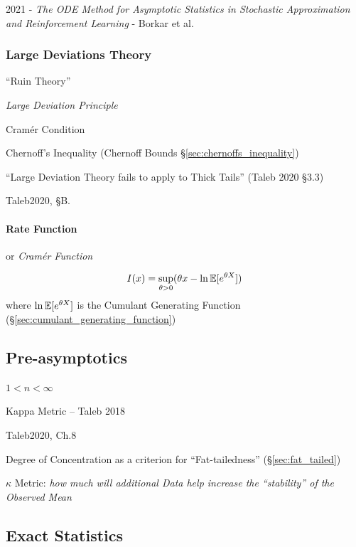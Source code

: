 2021 - \emph{The ODE Method for Asymptotic Statistics in Stochastic
Approximation and Reinforcement Learning} - Borkar et al.



\subsubsection{Large Deviations Theory}\label{sec:large_deviations_theory}

``Ruin Theory''

\emph{Large Deviation Principle}

Cram\'er Condition

Chernoff's Inequality (Chernoff Bounds \S\ref{sec:chernoffs_inequality})

``Large Deviation Theory fails to apply to Thick Tails'' (Taleb 2020 \S 3.3)

Taleb2020, \S B.



\paragraph{Rate Function}\label{sec:rate_function}\hfill

or \emph{Cram\'er Function}

\[
  I(x) = \sup_{\theta > 0} (\theta x - \ln \mathbb{E}[e^{\theta X}])
\]
where $\ln \mathbb{E}[e^{\theta X}]$ is the Cumulant Generating Function
(\S\ref{sec:cumulant_generating_function})



\subsection{Pre-asymptotics}\label{sec:preasymptotics}


$1 < n < \infty$

Kappa Metric -- Taleb 2018

Taleb2020, Ch.8

Degree of Concentration as a criterion for ``Fat-tailedness''
(\S\ref{sec:fat_tailed})

$\kappa$ Metric: \emph{how much will additional Data help increase the
``stability'' of the Observed Mean}



\subsection{Exact Statistics}\label{sec:exact_statistics}

